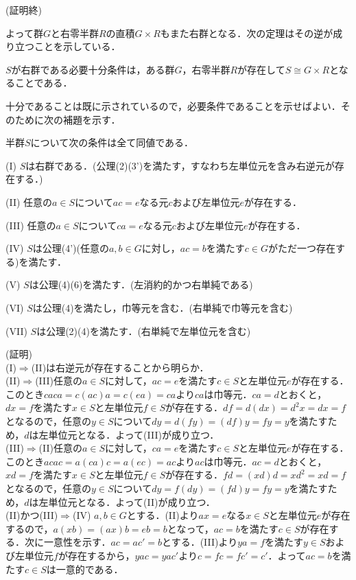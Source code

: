 \begin{flushright}
(証明終)
\end{flushright}
よって群$G$と右零半群$R$の直積$G\times R$もまた右群となる．次の定理はその逆が成り立つことを示している．
\begin{sthm}
$S$が右群である必要十分条件は，ある群$G$，右零半群$R$が存在して$S\cong G\times R$となることである．
\end{sthm}
十分であることは既に示されているので，必要条件であることを示せばよい．そのために次の補題を示す．
\begin{slem}
半群$S$について次の条件は全て同値である．
\begin{description}
\item{(I)} $S$は右群である．(公理(2)(3')を満たす，すなわち左単位元を含み右逆元が存在する．)
\item{(II)} 任意の$a\in S$について$ac=e$なる元$c$および左単位元$e$が存在する．
\item{(III)} 任意の$a\in S$について$ca=e$なる元$c$および左単位元$e$が存在する．
\item{(IV)} $S$は公理(4')(任意の$a,b\in G$に対し，$ac=b$を満たす$c\in G$がただ一つ存在する)を満たす．
\item{(V)} $S$は公理(4)(6)を満たす．(左消約的かつ右単純である)
\item{(VI)} $S$は公理(4)を満たし，巾等元を含む．(右単純で巾等元を含む)
\item{(VII)} $S$は公理(2)(4)を満たす．(右単純で左単位元を含む)
\end{description}
\end{slem}
(証明)\\
(I)$\Rightarrow$(II)は右逆元が存在することから明らか．\\
(II)$\Rightarrow$(III)任意の$a\in S$に対して，$ac=e$を満たす$c\in S$と左単位元$e$が存在する．このとき$caca=c(ac)a=c(ea)=ca$より$ca$は巾等元．$ca=d$とおくと，$dx=f$を満たす$x\in S$と左単位元$f\in S$が存在する．$df=d(dx)=d^2x=dx=f$となるので，任意の$y\in S$について$dy=d(fy)=(df)y=fy=y$を満たすため，$d$は左単位元となる．よって(III)が成り立つ．\\
(III)$\Rightarrow$(II)任意の$a\in S$に対して，$ca=e$を満たす$c\in S$と左単位元$e$が存在する．このとき$acac=a(ca)c=a(ec)=ac$より$ac$は巾等元．$ac=d$とおくと，$xd=f$を満たす$x\in S$と左単位元$f\in S$が存在する．$fd=(xd)d=xd^2=xd=f$となるので，任意の$y\in S$について$dy=f(dy)=(fd)y=fy=y$を満たすため，$d$は左単位元となる．よって(II)が成り立つ．\\
(II)かつ(III)$\Rightarrow$(IV) $a,b\in G$とする．(II)より$ax=e$なる$x\in S$と左単位元$e$が存在するので，$a(xb)=(ax)b=eb=b$となって，$ac=b$を満たす$c\in S$が存在する．次に一意性を示す．$ac=ac'=b$とする．(III)より$ya=f$を満たす$y\in S$および左単位元$f$が存在するから，$yac=yac'$より$c=fc=fc'=c'$．よって$ac=b$を満たす$c\in S$は一意的である．\\
